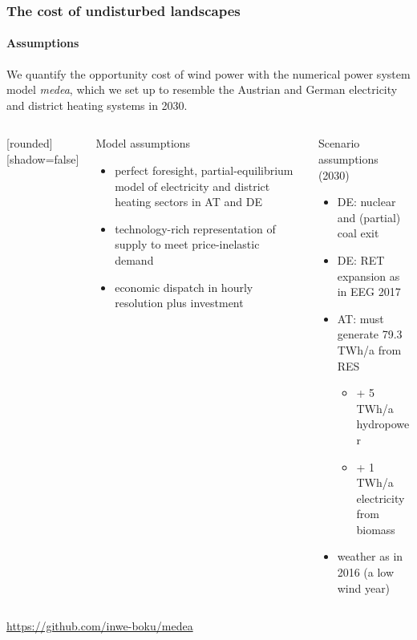 \documentclass[aspectratio=1610, xcolor=dvipsnames]{beamer}
\begin{document}
    \begin{frame}
        \frametitle{The cost of undisturbed landscapes}
        \framesubtitle{Assumptions}
        We quantify the opportunity cost of wind power with the numerical power system model \emph{medea}, which we set up
        to resemble the Austrian and German electricity and district heating systems in 2030.
        \begin{columns}[T]
        {%
            [rounded][shadow=false]
            \begin{column}{7cm}
                \begin{block}{Model assumptions}
                    \begin{itemize}
                        \item perfect foresight, partial-equilibrium model of electricity and district heating sectors in
                        AT and DE
                        \item technology-rich representation of supply to meet price-inelastic demand
                        \item economic dispatch in hourly resolution plus investment
                    \end{itemize}
                \end{block}
            \end{column}

            \begin{column}{7cm}
                \begin{block}{Scenario assumptions (2030)}
                    \begin{itemize}
                        \item DE: nuclear and (partial) coal exit
                        \item DE: RET expansion as in EEG 2017
                        \item AT: must generate 79.3 TWh/a from RES
                        \begin{itemize}
                            \item + 5 TWh/a hydropower
                            \item + 1 TWh/a electricity from biomass
                        \end{itemize}
                        \item weather as in 2016 (a low wind year)
                    \end{itemize}
                \end{block}
            \end{column}
        }%
        \end{columns}
        \bigskip
        \url{https://github.com/inwe-boku/medea}
    \end{frame}
\end{document}
